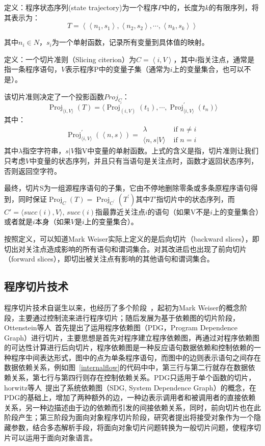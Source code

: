 定义：程序状态序列(state trajectory)为一个程序$P$中的，长度为$k$的有限序列，将其表示为：
$$T=\left\langle \left\langle n_{1},s_{1} \right\rangle, \left\langle n_{2},s_{2} \right\rangle , \cdots , \left\langle n_{k},s_{k} \right\rangle \right\rangle$$

其中$n_{i} \in N$，$s_i$为一个单射函数，记录所有变量到具体值的映射。

定义：一个切片准则（Slicing citerion）为$C=\left\langle i, V \right\rangle$，其中$i$指关注点，通常是指一条程序语句，$V$表示程序P中的变量子集（通常为$i$上的变量集合，也可以不是）。

该切片准则决定了一个投影函数$Proj_C$：
$$
\operatorname{Proj}_{\langle i, V\rangle}(T)=\langle\operatorname{Proj}_{(i, V)}^{\prime}\left(t_{1}\right) , \cdots, \operatorname{Proj}_{\langle i, V\rangle}^{\prime}\left(t_{n}\right) \rangle
$$
其中：
$$
\operatorname{Proj}_{\langle i, V\rangle}^{\prime}(\left\langle n, s \right\rangle)=\begin{array}{ll}
{\lambda} & {\text { if } n \neq i} \\
{\langle n, s | V \rangle} & {\text { if } n=i}
\end{array}
$$
其中$\lambda$指空字符串，$s|V$指V中变量的单射函数。上式的含义是指，切片准则让我们只考虑$V$中变量的状态序列，并且只有当语句是关注点时，函数才返回状态序列，否则返回空字符。

最终，切片S为一组源程序语句的子集，它由不停地删除零条或多条原程序语句得到，同时保证$\operatorname{Proj}_{C}(T)=\operatorname{Proj}_{C^{\prime}}\left(T^{\prime}\right)$其中$T'$指切片中的状态序列，而$C'=\langle succ(i), V \rangle$, $succ(i)$指最靠近关注点$i$的语句（如果V不是$i$上的变量集合）或者就是$i$本身（如果$ V $是$i$上的变量集合）。

按照定义，可以知道Mark Weiser实际上定义的是后向切片（backward slices），即切出对关注点造成影响的所有语句和谓词集合。对其改进后也出现了前向切片（forward slices），即切出被关注点有影响的其他语句和谓词集合。\\

\subsection{程序切片技术}
程序切片技术自诞生以来，也经历了多个阶段~\cite{slices:xu2005brief}，起初为Mark Weiser的概念阶段，主要通过控制流来进行程序切片；随后发展为基于依赖图的切片阶段，Ottenstein等人~\cite{slices:ottenstein1984program}首先提出了运用程序依赖图（PDG，Program Dependence Graph）进行切片，主要思想是首先对程序建立程序依赖图，再通过对程序依赖图的可达性计算进行后向切片，程序依赖图是一种反应语句数据依赖和控制依赖的一种程序中间表达形式，图中的点为单条程序语句，而图中的边则表示语句之间存在数据依赖关系，例如图~\ref{internalflow}的代码中中，第三行与第二行就存在数据依赖关系，第七行与第四行则存在控制依赖关系。PDG只适用于单个函数的切片，horwitz等人~\cite{slices:horwitz1990}提出了系统依赖图（SDG, System Dependence Graph）的概念，在PDG的基础上，增加了两种额外的边，一种边表示调用者和被调用者的直接依赖关系，另一种边描述由于边的依赖而引发的间接依赖关系，同时，前向切片也在此阶段产生；第三阶段为面向对象程序切片阶段，研究者提出将接受对象作为一个隐藏参数，结合多态解析手段，将面向对象切片问题转换为一般切片问题，使程序切片可以运用于面向对象语言。

